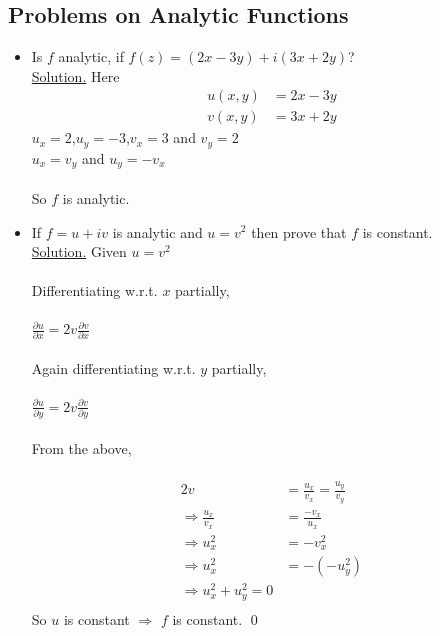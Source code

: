 \documentclass{article}
\begin{document}
\subsection{Problems on Analytic Functions}
\begin{itemize}
    \item Is $f$ analytic, if $f(z)=(2x-3y)+i(3x+2y)$?
    \\
    \underline{Solution.} Here 
    \begin{align}
    u(x,y)&=2x-3y \\
    v(x,y)&=3x+2y    
    \end{align}
    $u_x=2$,$u_y=-3$,$v_x=3$ and $v_y=2$
    \\
    $u_x=v_y$ and $u_y=-v_x$
    \\
    \\
    So $f$ is analytic.
    \item If $f=u+iv$ is analytic and $u=v^2$ then prove that $f$ is constant.
    \\
    \underline{Solution.} Given $u=v^2$
    \\
    \\
    Differentiating w.r.t. $x$ partially,
    \\
    \\
    $\frac{\partial u}{\partial x}=2v\frac{\partial v}{\partial x}$
    \\
    \\
    Again differentiating w.r.t. $y$ partially,
    \\
    \\
    $\frac{\partial u}{\partial y}=2v\frac{\partial v}{\partial y}$
    \\
    \\
    From the above,
    \\
    \\
    \begin{align}
        2v&=\frac{u_x}{v_x}=\frac{u_y}{v_y} \\
        \Rightarrow \frac{u_x}{v_x}&=\frac{-v_x}{u_x} \\
        \Rightarrow u_x^2&=-v_x^2 \\
        \Rightarrow u_x^2&=-(-u_y^2) \\
        \Rightarrow u_x^2+u_y^2=0 \\
    \end{align}
    So $u$ is constant $\Rightarrow$ $f$ is constant. \qed
\end{itemize}
\end{document}
